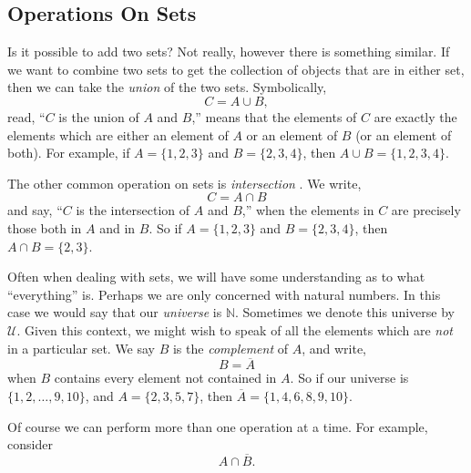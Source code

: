 \documentclass[10pt,]{book}
\theoremstyle{plain}
\theoremstyle{definition}
\theoremstyle{definition}
\theoremstyle{definition}
\numberwithin{equation}{section}
\def\N{\mathbb N}
\def\U{\mathcal U}
\def\bar{\overline}
\begin{document}
\subsection[Operations On Sets]{Operations On Sets}\label{subsection-6}

      Is it possible to add two sets? Not really, however there is something similar. If we want to combine two sets to get the collection of objects that are in either set, then we can take the \emph{union}
       of the two sets. Symbolically,
      \begin{equation*}
        C = A \cup B,
      \end{equation*}
      read, ``\(C\) is the union of \(A\) and \(B\),'' means that the elements of \(C\) are exactly the elements which are either an element of \(A\) or an element of \(B\) (or an element of both). For example, if \(A = \{1, 2, 3\}\) and \(B = \{2, 3, 4\}\), then \(A \cup B = \{1, 2, 3, 4\}\).
\par

      The other common operation on sets is \emph{intersection}
      . We write,
      \begin{equation*}
        C = A \cap B
      \end{equation*}
      and say, ``\(C\) is the intersection of \(A\) and \(B\),'' when the elements in \(C\) are precisely those both in \(A\) and in \(B\). So if \(A = \{1, 2, 3\}\) and \(B = \{2, 3, 4\}\), then \(A \cap B = \{2, 3\}\).
\par

      Often when dealing with sets, we will have some understanding as to what ``everything'' is. Perhaps we are only concerned with natural numbers. In this case we would say that our \emph{universe} is \(\N\). Sometimes we denote this universe by \(\U\). Given this context, we might wish to speak of all the elements which are \emph{not} in a particular set. We say \(B\) is the \emph{complement}
       of \(A\), and write,
      \begin{equation*}
        B = \bar A
      \end{equation*}
      when \(B\) contains every element not contained in \(A\). So if our universe is \(\{1, 2,\ldots, 9, 10\}\), and \(A = \{2, 3, 5, 7\}\), then \(\bar A = \{1, 4, 6, 8, 9,10\}\).
\par

      Of course we can perform more than one operation at a time. For example, consider
      \begin{equation*}
        A \cap \bar B.
      \end{equation*}
\par
\end{document}
